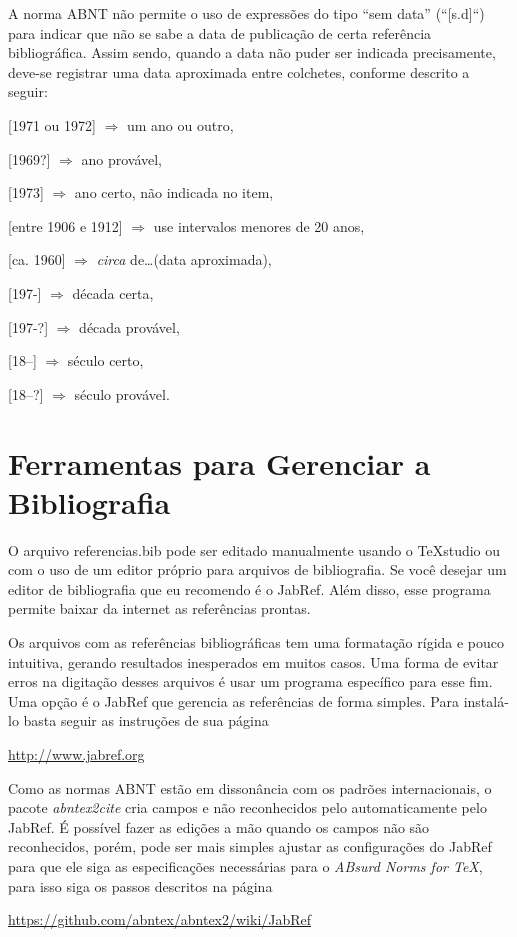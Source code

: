 \begin{apendicesenv}
    A norma ABNT não permite o uso de expressões do tipo ``sem data'' (``[s.d]``) para indicar que não se sabe a data de publicação de certa referência bibliográfica.
    Assim sendo, quando a data não puder ser indicada precisamente, deve-se registrar uma data aproximada entre colchetes, conforme descrito a seguir:

    [1971 ou 1972] $\Longrightarrow$ um ano ou outro,

    [1969?] $\Longrightarrow$ ano provável,

    [1973] $\Longrightarrow$ ano certo, não indicada no item,

    [entre 1906 e 1912] $\Longrightarrow$ use intervalos menores de 20 anos,

    [ca. 1960] $\Longrightarrow$ \textit{circa} de\ldots (data aproximada),

    [197-] $\Longrightarrow$ década certa,

    [197-?] $\Longrightarrow$ década provável,

    [18--] $\Longrightarrow$ século certo,

    [18--?] $\Longrightarrow$ século provável.

    \chapter{Ferramentas para Gerenciar a Bibliografia}
    \label{chap_ferramenta_para_gerenciar_a_bibliografia}

    O arquivo {\color{red} referencias.bib} pode ser editado manualmente usando o
    TeXstudio ou com o uso de um editor próprio para arquivos de bibliografia.
    Se você desejar um editor de bibliografia que eu recomendo é o JabRef.
    Além disso, esse programa permite baixar da internet as referências prontas.

    Os arquivos com as referências bibliográficas tem uma formatação rígida e pouco intuitiva, gerando resultados inesperados em muitos casos. Uma forma de evitar erros na digitação desses arquivos é usar um programa específico para esse fim. Uma opção é o JabRef que gerencia as referências de forma simples. Para instalá-lo basta seguir as instruções de sua página
    \begin{center}
        \url{http://www.jabref.org}
    \end{center}

    Como as normas ABNT estão em dissonância com os padrões internacionais,
    o pacote \textit{abntex2cite} cria campos e não reconhecidos pelo automaticamente
    pelo JabRef.
    É possível fazer as edições a mão quando os campos não são reconhecidos,
    porém, pode ser mais simples ajustar as configurações do JabRef para que
    ele siga as especificações necessárias para o \textit{ABsurd Norms for TeX},
    para isso siga os passos descritos na página
    \begin{center}
        \url{https://github.com/abntex/abntex2/wiki/JabRef}
    \end{center}


\end{apendicesenv}
